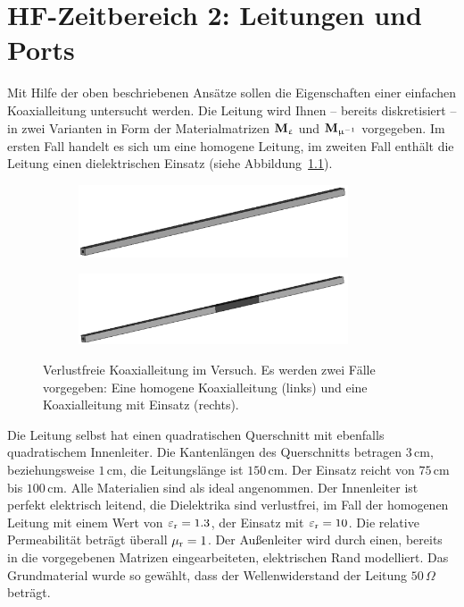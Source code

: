 \documentclass[Protokollheft.tex]{subfiles}
\begin{document}
\chapter{HF-Zeitbereich 2: Leitungen und Ports}

    Mit Hilfe der oben beschriebenen Ansätze sollen die Eigenschaften
    einer einfachen Koaxialleitung untersucht werden. Die Leitung wird
    Ihnen -- bereits diskretisiert -- in zwei Varianten in Form der Materialmatrizen
    $\mathbf{M}_{\upvarepsilon}$ und $\mathbf{M}_{\upmu^{-1}}$ vorgegeben. Im ersten Fall
    handelt es sich um eine homogene Leitung, im zweiten Fall enthält
    die Leitung einen dielektrischen Einsatz (siehe Abbildung~\ref{b1}).
    \begin{figure}[ht]
        \centering
        \begin{subfigure}{0.49\textwidth}
            \centering
            \includegraphics[width=8cm]{v7_homogen.pdf}
        \end{subfigure}
        \begin{subfigure}{0.49\textwidth}
            \centering
            \includegraphics[width=8cm]{v7_inhomogen.pdf}
        \end{subfigure}
        \caption{Verlustfreie Koaxialleitung im Versuch. Es werden zwei Fälle vorgegeben: Eine homogene Koaxialleitung (links) und eine Koaxialleitung mit Einsatz (rechts).}\label{b1}
    \end{figure}
    Die Leitung selbst hat einen quadratischen Querschnitt mit
    ebenfalls quadratischem Innenleiter. Die Kantenlängen des
    Querschnitts betragen $3\,\text{cm}$, beziehungsweise $1\,\text{cm}$, die
    Leitungslänge ist $150\,\text{cm}$.
    Der Einsatz reicht von $75\,\text{cm}$ bis $100\,\text{cm}$.
    Alle Materialien sind als ideal angenommen. Der Innenleiter ist
    perfekt elektrisch leitend, die Dielektrika
    sind verlustfrei, im Fall der homogenen Leitung mit einem Wert von
    $\varepsilon_\text{r}=1.3$, der Einsatz mit $\varepsilon_\text{r}=10$. Die relative Permeabilität beträgt überall $\mu_{\text{r}}=1$. Der Außenleiter wird durch
    einen, bereits in die vorgegebenen Matrizen eingearbeiteten,
    elektrischen Rand modelliert. Das Grundmaterial wurde so gewählt,
    dass der Wellenwiderstand der Leitung $50\,\Omega$ beträgt.
    
\end{document}
